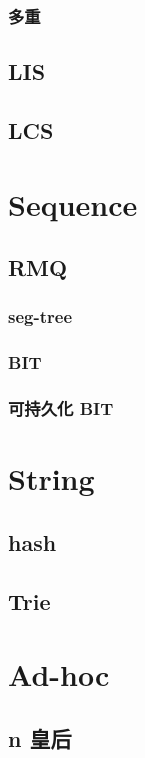 \subsubsection{多重}


\subsection{LIS}


\subsection{LCS}


\section{Sequence}

\subsection{RMQ}
\subsubsection{seg-tree}


\subsubsection{BIT}


\subsubsection{可持久化 BIT}


% 

\section{String}

\subsection{hash}


\subsection{Trie}


\section{Ad-hoc}

\subsection{n 皇后}


